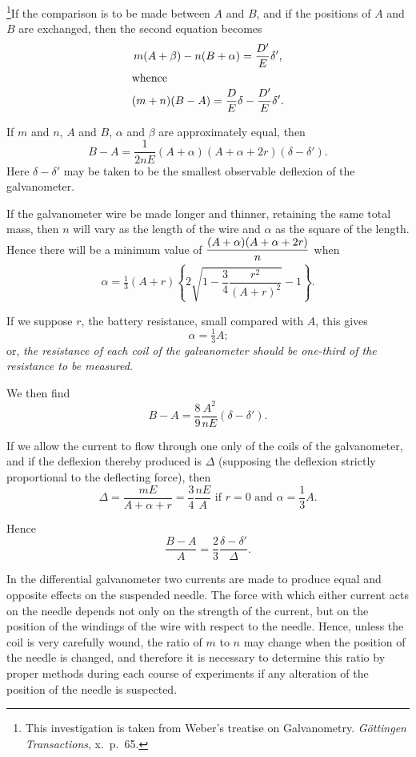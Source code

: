 \documentclass[12pt,oneside]{book}[2021/10/04]
\let\oldfootnote\footnote
\renewcommand\footnote[1]{%
\oldfootnote{\hspace{0.14em}#1}}
\newcommand{\Runhead}[1]{\fancyhead[C]{\iffloatpage{}{\small#1}}}
\newcommand{\xp}{\rule[-2.0ex]{0pt}{5.2ex}}
\newcommand{\¬}{\hphantom{0}}
\begin{document}
\footnote{This investigation is taken from Weber's treatise on Galvanometry. \textit{Göttingen
Transactions}, x.\ p.\ 65.}If the comparison is to be made between \(A\) and \(B\), and if the
positions of \(A\) and \(B\) are exchanged, then the second equation
becomes
\begin{gather*}
m(A+\beta) - n(B+\alpha) = \frac{D'}{E} \delta'\text{,}\\
\shortintertext{whence}
(m + n)(B - A) = \frac{D}{E} \delta - \frac{D'}{ E} \delta'\text{.}
\end{gather*}

If \(m\) and \(n\), \(A\) and \(B\), \(\alpha\) and \(\beta\) are approximately equal, then
\[
B - A = \frac{1}{2nE} (A + \alpha)(A + \alpha + 2r)(\delta - \delta')\text{.}
\]
Here \(\delta - \delta'\) may be taken to be the smallest observable deflexion
of the galvanometer.

If the galvanometer wire be made longer and thinner, retaining
the same total mass, then \(n\) will vary as the length of the wire
and \(\alpha\) as the square of the length. Hence there will be a minimum
value of \(\xp\dfrac{(A + \alpha)(A + \alpha + 2r)}{n}\) when
\[
\alpha = \tfrac{1}{3}(A + r) \left\{2 \sqrt{1 - \frac{3}{4}\frac{r^2}{(A + r)^2}}-1\right\}\text{.}
\]

If we suppose \(r\), the battery resistance, small compared with \(A\),
this gives
\[
\alpha = \tfrac{1}{3} A\text{;}
\]
or, \textit{the resistance of each coil of the galvanometer should be one-third
of the resistance to be measured.}

We then find
\[
B - A = \frac{8}{9}\frac{A^2}{nE}(\delta - \delta')\text{.}
\]

If we allow the current to flow through one only of the coils
of the galvanometer, and if the deflexion thereby produced is \(\Delta\)
(supposing the deflexion strictly proportional to the deflecting
force), then
\[
\Delta = \frac{mE}{A + \alpha + r} = \frac{3}{4}\frac{nE}{A}\text{ if }r = 0\text{ and }\alpha = \frac{1}{3} A\text{.}
\]

Hence
\[
\frac{B - A}{A} = \frac{2}{3}\frac{\delta - \delta'}{\Delta}\text{.}
\]

In the differential galvanometer two currents are made to
produce equal and opposite effects on the suspended needle. The
force with which either current acts on the needle depends not
only on the strength of the current, but on the position of the
windings of the wire with respect to the needle. Hence, unless
the coil is very carefully wound, the ratio of \(m\) to \(n\) may change
when the position of the needle is changed, and therefore it is
necessary to determine this ratio by proper methods during each
course of experiments if any alteration of the position of the needle
is suspected.
\Runhead{DIFFERENTIAL GALVANOMETER.}
\end{document}
